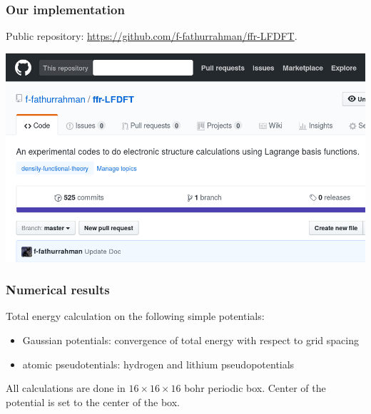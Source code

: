 \documentclass[10pt,t]{beamer}
\begin{document}
\begin{frame}
\frametitle{Our implementation}
  
Public repository: \url{https://github.com/f-fathurrahman/ffr-LFDFT}.
  
{\centering
\includegraphics[scale=0.25]{images/ffr-LFDFT-github-cropped.png}
\par}
  
\end{frame}
  

\begin{frame}
\frametitle{Numerical results}

Total energy calculation on the following simple potentials:
\begin{itemize}
\item Gaussian potentials: convergence of total energy with respect to
grid spacing
\item atomic pseudotentials: hydrogen and lithium pseudopotentials
\end{itemize}

All calculations are done in $16\times16\times16$ bohr periodic box.
Center of the potential is set to the center of the box.

\end{frame}
\end{document}
